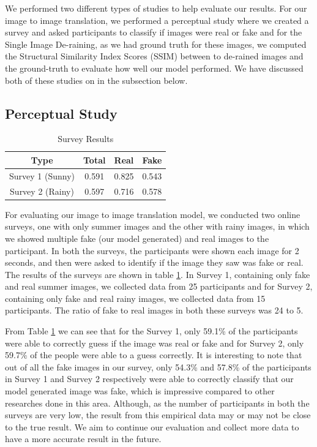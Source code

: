 \documentclass{article}
\begin{document}
We performed two different types of studies to help evaluate our results. For our image to image translation, we performed a perceptual study where we created a survey and asked participants to classify if images were real or fake and for the Single Image De-raining, as we had ground truth for these images, we computed the Structural Similarity Index Scores (SSIM) between to de-rained images and the ground-truth to evaluate how well our model performed. We have discussed both of these studies on in the subsection below.

\subsection{Perceptual Study}

\begin{table} [h!]
\centering
\begin{tabular}{ | c | c | c | c |}
\hline
 Type & Total & Real & Fake \\ 
\hline
 Survey 1 (Sunny) &  0.591 & 0.825 & 0.543 \\  
 Survey 2 (Rainy) & 0.597 & 0.716 & 0.578 \\
 \hline
\end{tabular}
\caption{Survey Results}
\label{table:1}
\end{table}

For evaluating our image to image translation model, we conducted two online surveys, one with only summer images and the other with rainy images, in which we showed multiple fake (our model generated) and real images to the participant. In both the surveys, the participants were shown each image for 2 seconds, and then were asked to identify if the image they saw was fake or real. The results of the surveys are shown in table \ref{table:1}. In Survey 1, containing only fake and real summer images, we collected data from 25 participants and for Survey 2, containing only fake and real rainy images, we collected data from 15 participants. The ratio of fake to real images in both these surveys was 24 to 5.

From Table \ref{table:1} we can see that for the Survey 1, only 59.1\% of the participants were able to correctly guess if the image was real or fake and for Survey 2, only 59.7\% of the people were able to a guess correctly. It is interesting to note that out of all the fake images in our survey, only 54.3\% and 57.8\% of the participants in Survey 1 and  Survey 2 respectively were able to correctly classify that our model generated image was fake, which is impressive compared to other researches done in this area. Although, as the number of participants in both the surveys are very low, the result from this empirical data may or may not be close to the true result. We aim to continue our evaluation and collect more data to have a more accurate result in the future.
\end{document}
